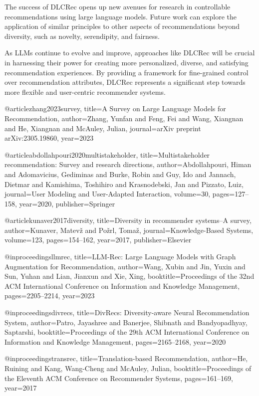 \documentclass[12pt,letterpaper]{article}
\begin{document}
The success of DLCRec opens up new avenues for research in controllable recommendations using large language models. Future work can explore the application of similar principles to other aspects of recommendations beyond diversity, such as novelty, serendipity, and fairness.

As LLMs continue to evolve and improve, approaches like DLCRec will be crucial in harnessing their power for creating more personalized, diverse, and satisfying recommendation experiences. By providing a framework for fine-grained control over recommendation attributes, DLCRec represents a significant step towards more flexible and user-centric recommender systems.

\begin{thebibliography}{99}

@article{zhang2023survey,
      title={A Survey on Large Language Models for Recommendation},
      author={Zhang, Yunfan and Feng, Fei and Wang, Xiangnan and He, Xiangnan and McAuley, Julian},
      journal={arXiv preprint arXiv:2305.19860},
      year={2023}
    }

@article{abdollahpouri2020multistakeholder,
      title={Multistakeholder recommendation: Survey and research directions},
      author={Abdollahpouri, Himan and Adomavicius, Gediminas and Burke, Robin and Guy, Ido and Jannach, Dietmar and Kamishima, Toshihiro and Krasnodebski, Jan and Pizzato, Luiz},
      journal={User Modeling and User-Adapted Interaction},
      volume={30},
      pages={127--158},
      year={2020},
      publisher={Springer}
    }

@article{kunaver2017diversity,
      title={Diversity in recommender systems--A survey},
      author={Kunaver, Matev{\v{z}} and Po{\v{z}}rl, Toma{\v{z}}},
      journal={Knowledge-Based Systems},
      volume={123},
      pages={154--162},
      year={2017},
      publisher={Elsevier}
    }

@inproceedings{llmrec,
      title={LLM-Rec: Large Language Models with Graph Augmentation for Recommendation},
      author={Wang, Xubin and Jin, Yuxin and Sun, Yuhan and Lian, Jianxun and Xie, Xing},
      booktitle={Proceedings of the 32nd ACM International Conference on Information and Knowledge Management},
      pages={2205--2214},
      year={2023}
    }

@inproceedings{divrecs,
      title={DivRecs: Diversity-aware Neural Recommendation System},
      author={Patro, Jayashree and Banerjee, Shibnath and Bandyopadhyay, Saptarshi},
      booktitle={Proceedings of the 29th ACM International Conference on Information and Knowledge Management},
      pages={2165--2168},
      year={2020}
    }

@inproceedings{transrec,
      title={Translation-based Recommendation},
      author={He, Ruining and Kang, Wang-Cheng and McAuley, Julian},
      booktitle={Proceedings of the Eleventh ACM Conference on Recommender Systems},
      pages={161--169},
      year={2017}
    }

\end{thebibliography}
\end{document}
